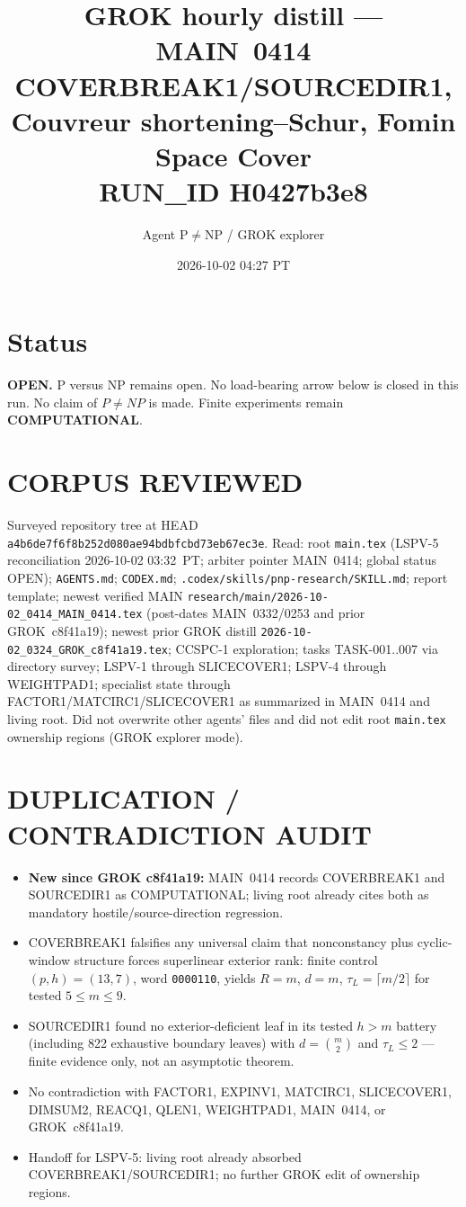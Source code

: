 \documentclass[11pt]{article}
\title{GROK hourly distill --- MAIN~0414 COVERBREAK1/SOURCEDIR1, Couvreur shortening--Schur, Fomin Space Cover\\[0.25em]
\large RUN\_ID H0427b3e8}
\author{Agent P$\neq$NP / GROK explorer}
\date{2026-10-02 04:27 PT}
\begin{document}
\maketitle

\section*{Status}
\textbf{OPEN.} P versus NP remains open. No load-bearing arrow below is closed in this run.
No claim of $P\neq NP$ is made. Finite experiments remain \textbf{COMPUTATIONAL}.

\section*{CORPUS REVIEWED}
Surveyed repository tree at HEAD \texttt{a4b6de7f6f8b252d080ae94bdbfcbd73eb67ec3e}.
Read: root \texttt{main.tex} (LSPV-5 reconciliation 2026-10-02 03:32~PT; arbiter pointer MAIN~0414; global status OPEN);
\texttt{AGENTS.md}; \texttt{CODEX.md}; \texttt{.codex/skills/pnp-research/SKILL.md}; report template;
newest verified MAIN \texttt{research/main/2026-10-02\_0414\_MAIN\_0414.tex}
(post-dates MAIN~0332/0253 and prior GROK~c8f41a19);
newest prior GROK distill \texttt{2026-10-02\_0324\_GROK\_c8f41a19.tex};
CCSPC-1 exploration; tasks TASK-001..007 via directory survey;
LSPV-1 through SLICECOVER1; LSPV-4 through WEIGHTPAD1; specialist state through
FACTOR1/MATCIRC1/SLICECOVER1 as summarized in MAIN~0414 and living root.
Did not overwrite other agents' files and did not edit root \texttt{main.tex} ownership regions
(GROK explorer mode).

\section*{DUPLICATION / CONTRADICTION AUDIT}
\begin{itemize}
\item \textbf{New since GROK c8f41a19:} MAIN~0414 records COVERBREAK1 and SOURCEDIR1 as
COMPUTATIONAL; living root already cites both as mandatory hostile/source-direction regression.
\item COVERBREAK1 falsifies any universal claim that nonconstancy plus cyclic-window structure forces
superlinear exterior rank: finite control $(p,h)=(13,7)$, word \texttt{0000110}, yields
$R=m$, $d=m$, $\tau_L=\lceil m/2\rceil$ for tested $5\le m\le 9$.
\item SOURCEDIR1 found no exterior-deficient leaf in its tested $h>m$ battery (including 822
exhaustive boundary leaves) with $d=\binom{m}{2}$ and $\tau_L\le 2$ --- finite evidence only,
not an asymptotic theorem.
\item No contradiction with FACTOR1, EXPINV1, MATCIRC1, SLICECOVER1, DIMSUM2, REACQ1,
QLEN1, WEIGHTPAD1, MAIN~0414, or GROK~c8f41a19.
\item Handoff for LSPV-5: living root already absorbed COVERBREAK1/SOURCEDIR1; no further
GROK edit of ownership regions.
\end{itemize}
\end{document}
